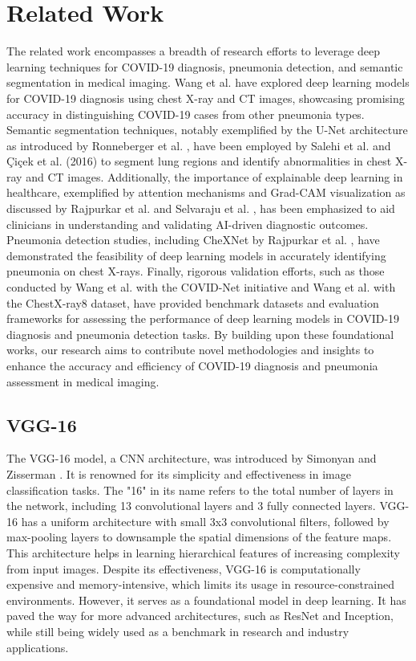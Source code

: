 \section{Related Work}
The related work encompasses a breadth of research efforts to leverage deep learning techniques for COVID-19 diagnosis, pneumonia detection, and semantic segmentation in medical imaging. Wang et al. \cite{Wang2019} have explored deep learning models for COVID-19 diagnosis using chest X-ray and CT images, showcasing promising accuracy in distinguishing COVID-19 cases from other pneumonia types. Semantic segmentation techniques, notably exemplified by the U-Net architecture as introduced by Ronneberger et al. \cite{Ronneberger2015}, have been employed by Salehi et al. \cite{Salehi2023} and Çiçek et al. (2016) to segment lung regions and identify abnormalities in chest X-ray and CT images. Additionally, the importance of explainable deep learning in healthcare, exemplified by attention mechanisms and Grad-CAM visualization as discussed by Rajpurkar et al. \cite{Rajpurkar2017} and Selvaraju et al. \cite{Selvaraju2017}, has been emphasized to aid clinicians in understanding and validating AI-driven diagnostic outcomes. Pneumonia detection studies, including CheXNet by Rajpurkar et al. \cite{Rajpurkar2017}, have demonstrated the feasibility of deep learning models in accurately identifying pneumonia on chest X-rays. Finally, rigorous validation efforts, such as those conducted by Wang et al. \cite{Wang2019} with the COVID-Net initiative and Wang et al. \cite{Wang2017} with the ChestX-ray8 dataset, have provided benchmark datasets and evaluation frameworks for assessing the performance of deep learning models in COVID-19 diagnosis and pneumonia detection tasks. By building upon these foundational works, our research aims to contribute novel methodologies and insights to enhance the accuracy and efficiency of COVID-19 diagnosis and pneumonia assessment in medical imaging.

\subsection{VGG-16}
The VGG-16 model, a CNN architecture, was introduced by Simonyan and Zisserman \cite{Simonyan2015} \cite{Sharma2023}. It is renowned for its simplicity and effectiveness in image classification tasks. The "16" in its name refers to the total number of layers in the network, including 13 convolutional layers and 3 fully connected layers. VGG-16 has a uniform architecture with small 3x3 convolutional filters, followed by max-pooling layers to downsample the spatial dimensions of the feature maps. This architecture helps in learning hierarchical features of increasing complexity from input images. Despite its effectiveness, VGG-16 is computationally expensive and memory-intensive, which limits its usage in resource-constrained environments. However, it serves as a foundational model in deep learning. It has paved the way for more advanced architectures, such as ResNet and Inception, while still being widely used as a benchmark in research and industry applications.


